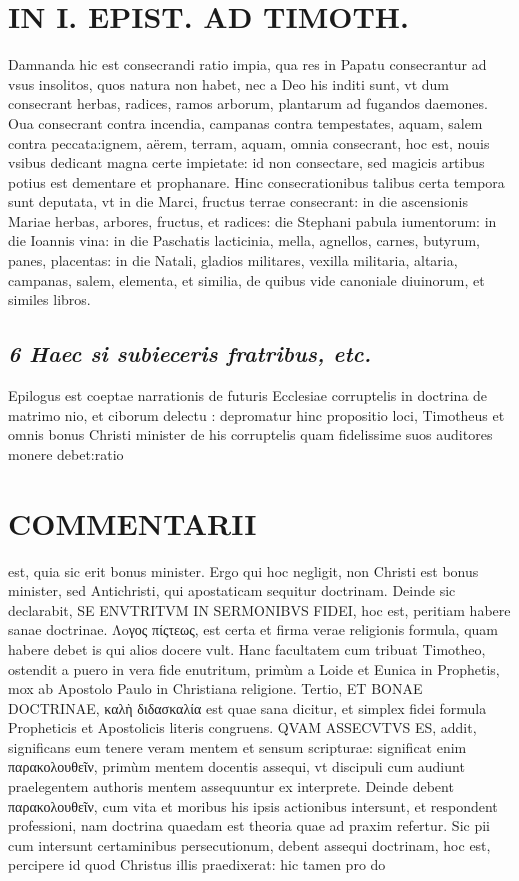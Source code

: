 \documentclass{article}
\begin{document}
\begin{pages}
\section*{IN I. EPIST. AD TIMOTH. }
\marginpar{[ p.93 ]}\pstart Damnanda hic est consecrandi ratio impia, qua res in Papatu consecrantur ad vsus insolitos, quos natura non habet, nec a Deo his inditi sunt, vt dum consecrant herbas, radices, ramos arborum, plantarum ad fugandos daemones. Oua consecrant contra incendia, campanas contra tempestates, aquam, salem contra peccata:ignem, aërem, terram, aquam, omnia consecrant, hoc est, nouis vsibus dedicant magna certe impietate: id non consectare, sed magicis artibus potius est dementare et prophanare. Hinc consecrationibus talibus certa tempora sunt deputata, vt in die Marci, fructus terrae consecrant: in die ascensionis Mariae herbas, arbores, fructus, et radices: die Stephani pabula iumentorum: in die Ioannis vina: in die Paschatis lacticinia, mella, agnellos, carnes, butyrum, panes, placentas: in die Natali, gladios militares, vexilla militaria, altaria, campanas, salem, elementa, et similia, de quibus vide canoniale diuinorum, et similes libros.  \pend
{}
{}
\subsection*{\textit{6 Haec si subieceris fratribus, etc. }}\pstart Epilogus est coeptae narrationis de futuris Ecclesiae corruptelis in doctrina de matrimo nio, et ciborum delectu : depromatur hinc propositio loci, Timotheus et omnis bonus Christi minister de his corruptelis quam fidelissime suos auditores monere debet:ratio  \pend
\section*{COMMENTARII }
\marginpar{[ p.94 ]}\pstart est, quia sic erit bonus minister. Ergo qui hoc negligit, non Christi est bonus minister, sed Antichristi, qui apostaticam sequitur doctrinam. Deinde sic declarabit, SE ENVTRITVM IN SERMONIBVS FIDEI, hoc est, peritiam habere sanae doctrinae. Λoγος πίςτεως, est certa et firma verae religionis formula, quam habere debet is qui alios docere vult. Hanc facultatem cum tribuat Timotheo, ostendit a puero in vera fide enutritum, primùm a Loide et Eunica in Prophetis, mox ab Apostolo Paulo in Christiana religione.  \pend\pstart Tertio, ET BONAE DOCTRINAE, καλὴ διδασκαλία est quae sana dicitur, et simplex fidei formula Propheticis et Apostolicis literis congruens. QVAM ASSECVTVS ES, addit, significans eum tenere veram mentem et sensum scripturae: significat enim παρακολουθεῖν, primùm mentem docentis assequi, vt discipuli cum audiunt praelegentem authoris mentem assequuntur ex interprete. Deinde debent παρακολουθεῖν, cum vita et moribus  his ipsis actionibus intersunt, et respondent professioni, nam doctrina quaedam est theoria quae ad praxim refertur. Sic pii cum intersunt certaminibus persecutionum, debent assequi doctrinam, hoc est, percipere id quod Christus illis praedixerat: hic tamen pro do\pend

\end{pages}
\end{document}
